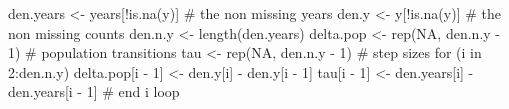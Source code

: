 \begin{Schunk}
\begin{Sinput}
 den.years <- years[!is.na(y)] # the non missing years
 den.y <- y[!is.na(y)] # the non missing counts
 den.n.y <- length(den.years)
 delta.pop <- rep(NA, den.n.y - 1) # population transitions
 tau <- rep(NA, den.n.y - 1) # step sizes
 for (i in 2:den.n.y) {
   delta.pop[i - 1] <- den.y[i] - den.y[i - 1]
   tau[i - 1] <- den.years[i] - den.years[i - 1]
 } # end i loop
\end{Sinput}
\end{Schunk}
